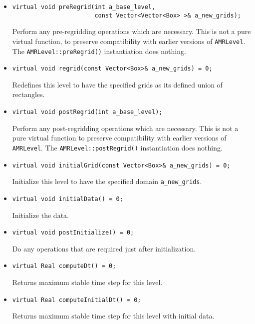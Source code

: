 \begin{itemize}
\item
\begin{verbatim}
virtual void preRegrid(int a_base_level,
                       const Vector<Vector<Box> >& a_new_grids);
\end{verbatim}
Perform any pre-regridding operations which are necessary.
This is not a pure virtual function, to preserve compatibility
with earlier versions of \verb|AMRLevel|.  The \verb|AMRLevel::preRegrid()|
instantiation does nothing.

\item
\begin{verbatim}
virtual void regrid(const Vector<Box>& a_new_grids) = 0;
\end{verbatim}
Redefines this level to have the specified grids as its defined union of
rectangles.

\item
\begin{verbatim}
virtual void postRegrid(int a_base_level);
\end{verbatim}
Perform any post-regridding operations which are necessary.
This is not a pure virtual function to preserve compatibility
with earlier versions of \verb|AMRLevel|.  The \verb|AMRLevel::postRegrid()|
instantiation does nothing.

\item
\begin{verbatim}
virtual void initialGrid(const Vector<Box>& a_new_grids) = 0;
\end{verbatim}
Initialize this level to have the specified domain \verb/a_new_grids/.

\item
\begin{verbatim}
virtual void initialData() = 0;
\end{verbatim}
Initialize the data.

\item
\begin{verbatim}
virtual void postInitialize() = 0;
\end{verbatim}
Do any operations that are required just after initialization.

\item
\begin{verbatim}
virtual Real computeDt() = 0;
\end{verbatim}
Returns maximum stable time step for this level.

\item
\begin{verbatim}
virtual Real computeInitialDt() = 0;
\end{verbatim}
Returns maximum stable time step for this level with initial data.


\end{itemize}
